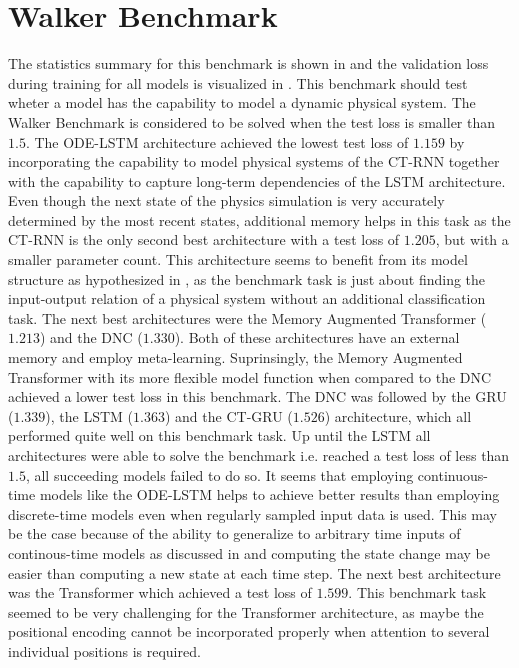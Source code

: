 \documentclass[draft,final]{vutinfth} %
\begin{document}
    \section{Walker Benchmark} \label{walker_results}
    The statistics summary for this benchmark is shown in  and the validation loss during training for all models is visualized in .
    This benchmark should test wheter a model has the capability to model a dynamic physical system.
    The Walker Benchmark is considered to be solved when the test loss is smaller than $1.5$.
    The ODE-LSTM architecture achieved the lowest test loss of $1.159$ by incorporating the capability to model physical systems of the CT-RNN together with the capability to capture long-term dependencies of the LSTM architecture.
    Even though the next state of the physics simulation is very accurately determined by the most recent states, additional memory helps in this task as the CT-RNN is the only second best architecture with a test loss of $1.205$, but with a smaller parameter count.
    This architecture seems to benefit from its model structure as hypothesized in , as the benchmark task is just about finding the input-output relation of a physical system without an additional classification task.
    The next best architectures were the Memory Augmented Transformer ($1.213$) and the DNC ($1.330$). 
    Both of these architectures have an external memory and employ meta-learning.
    Suprinsingly, the Memory Augmented Transformer with its more flexible model function when compared to the DNC achieved a lower test loss in this benchmark.
    The DNC was followed by the GRU ($1.339$), the LSTM ($1.363$) and the CT-GRU ($1.526$) architecture, which all performed quite well on this benchmark task.
    Up until the LSTM all architectures were able to solve the benchmark i.e. reached a test loss of less than $1.5$, all succeeding models failed to do so.
    It seems that employing continuous-time models like the ODE-LSTM helps to achieve better results than employing discrete-time models even when regularly sampled input data is used.
    This may be the case because of the ability to generalize to arbitrary time inputs of continous-time models as discussed in  and computing the state change may be easier than computing a new state at each time step.
    The next best architecture was the Transformer which achieved a test loss of $1.599$.
    This benchmark task seemed to be very challenging for the Transformer architecture, as maybe the positional encoding cannot be incorporated properly when attention to several individual positions is required.
\end{document}
